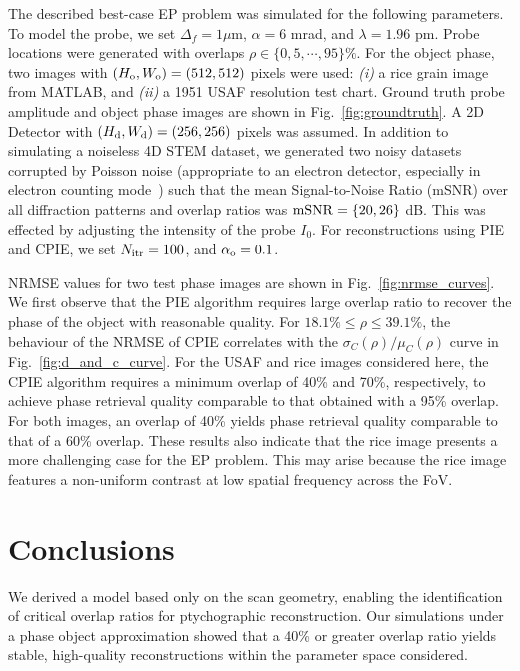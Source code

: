 \documentclass[11pt,draftclsnofoot,onecolumn]{IEEEtran}
\begin{document}
The described best-case EP problem was simulated for the following parameters.
To model the probe, we set $\Delta_f = 1\mu$m, $\alpha = 6$ mrad, and $\lambda = 1.96$ pm. Probe locations were generated with overlaps $\rho \in \{0,5,\cdots, 95\}\%$. For the object phase, two images with $(H_{\rm o}, W_{\rm o}) = (512, 512)$ pixels were used: \textit{(i)} a rice grain image from MATLAB, and \textit{(ii)} a 1951 USAF resolution test chart. Ground truth probe amplitude and object phase images are shown in Fig.~\ref{fig:groundtruth}. A 2D Detector with $(H_{\rm d},W_{\rm d}) = (256, 256)$ pixels was assumed. In addition to simulating a noiseless 4D STEM dataset, we generated two noisy datasets corrupted by Poisson noise (appropriate to an electron detector, especially in electron counting mode~\cite{levin2021direct}) such that the mean Signal-to-Noise Ratio (mSNR) over all diffraction patterns and overlap ratios was ${\rm mSNR} = \{20,26\}$ dB. This was effected by adjusting the intensity of the probe $I_0$. For reconstructions using PIE and CPIE, we set $N_{\rm itr} = 100$, and $\alpha_{\rm o} = 0.1$.

 NRMSE values for two test phase images are shown in Fig.~\ref{fig:nrmse_curves}. We first observe that the PIE algorithm requires large overlap ratio to recover the phase of the object with reasonable quality. For $18.1\%\le\rho\le 39.1\%$, the behaviour of the NRMSE of CPIE correlates with the $\sigma_C(\rho)/\mu_C(\rho)$ curve in Fig.~\ref{fig:d_and_c_curve}. For the USAF and rice images considered here, the CPIE algorithm requires a minimum overlap of 40\% and 70\%, respectively, to achieve phase retrieval quality comparable to that obtained with a 95\% overlap. For both images, an overlap of 40\% yields phase retrieval quality comparable to that of a 60\% overlap. These results also indicate that the rice image presents a more challenging case for the EP problem. This  may arise because the rice image features a non-uniform contrast at low spatial frequency across the FoV.

\section{Conclusions}\label{sec:conclusion}
We derived a model based only on the scan geometry, enabling the identification of critical overlap ratios for ptychographic reconstruction. Our simulations under a phase object approximation showed that a 40\% or greater overlap ratio yields stable, high-quality reconstructions within the parameter space considered.



\end{document}
